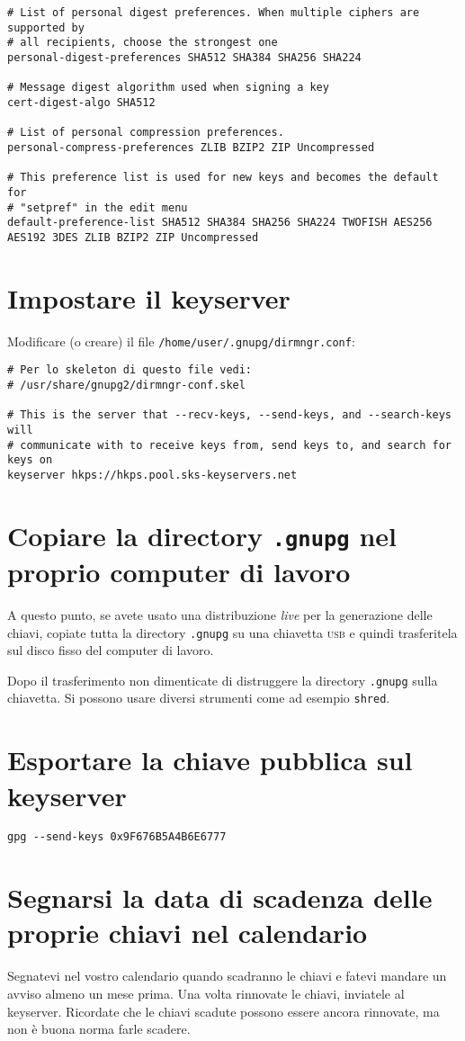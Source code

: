 \begin{lstlisting}
# List of personal digest preferences. When multiple ciphers are supported by
# all recipients, choose the strongest one
personal-digest-preferences SHA512 SHA384 SHA256 SHA224

# Message digest algorithm used when signing a key
cert-digest-algo SHA512

# List of personal compression preferences.
personal-compress-preferences ZLIB BZIP2 ZIP Uncompressed

# This preference list is used for new keys and becomes the default for
# "setpref" in the edit menu
default-preference-list SHA512 SHA384 SHA256 SHA224 TWOFISH AES256 AES192 3DES ZLIB BZIP2 ZIP Uncompressed
\end{lstlisting}

\section{Impostare il keyserver}

Modificare (o creare) il file \texttt{/home/user/.gnupg/dirmngr.conf}:

\begin{lstlisting}
# Per lo skeleton di questo file vedi:
# /usr/share/gnupg2/dirmngr-conf.skel

# This is the server that --recv-keys, --send-keys, and --search-keys will
# communicate with to receive keys from, send keys to, and search for keys on
keyserver hkps://hkps.pool.sks-keyservers.net
\end{lstlisting}

\section{Copiare la directory \texttt{.gnupg} nel proprio computer di lavoro}

A questo punto, se avete usato una distribuzione \textit{live} per la
generazione delle chiavi, copiate tutta la directory \texttt{.gnupg} su una
chiavetta \textsc{usb} e quindi trasferitela sul disco fisso del computer di
lavoro.

Dopo il trasferimento non dimenticate di distruggere la directory
\texttt{.gnupg} sulla chiavetta. Si possono usare diversi strumenti come ad
esempio \texttt{shred}.

\section{Esportare la chiave pubblica sul keyserver}

\begin{lstlisting}
gpg --send-keys 0x9F676B5A4B6E6777
\end{lstlisting}

\section{Segnarsi la data di scadenza delle proprie chiavi nel calendario}

Segnatevi nel vostro calendario quando scadranno le chiavi e fatevi mandare un
avviso almeno un mese prima. Una volta rinnovate le chiavi, inviatele al
keyserver. Ricordate che le chiavi scadute possono essere ancora rinnovate, ma
non è buona norma farle scadere.
